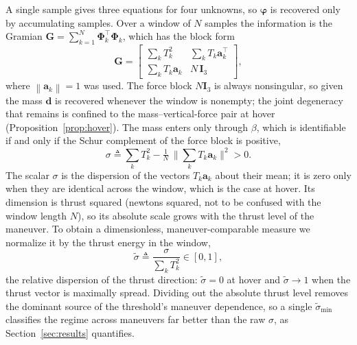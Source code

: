 \documentclass[lettersize,journal]{IEEEtran}
\newcommand{\norm}[1]{\left\| #1 \right\|}
\newcommand{\vect}[1]{\bm{#1}}
\newcommand{\mat}[1]{\mathbf{#1}}
\begin{document}
A single sample gives three equations for four unknowns, so $\vect{\varphi}$ is
recovered only by accumulating samples. Over a window of $N$ samples the
information is the Gramian $\mat{G}=\sum_{k=1}^{N}\mat{\Phi}_k^{\!\top}\mat{\Phi}_k$,
which has the block form
\begin{equation}
\mat{G}=
\begin{bmatrix}
\sum_k T_k^2 & \sum_k T_k\vect{a}_k^{\!\top}\\[2pt]
\sum_k T_k\vect{a}_k & N\,\mat{I}_3
\end{bmatrix},
\label{eq:gramian}
\end{equation}
where $\norm{\vect{a}_k}=1$ was used. The force block $N\mat{I}_3$ is always
nonsingular, so given the mass $\vect{d}$ is recovered whenever the
window is nonempty; the joint degeneracy that remains is confined to the
mass--vertical-force pair at hover (Proposition~\ref{prop:hover}). The
mass enters only through $\beta$, which is identifiable if and only if the Schur
complement of the force block is positive,
\begin{equation}
\sigma \triangleq \sum_k T_k^2 - \tfrac{1}{N}\,\Big\|\textstyle\sum_k T_k\vect{a}_k\Big\|^2 > 0 .
\label{eq:schur}
\end{equation}
The scalar $\sigma$ is the dispersion of the vectors $T_k\vect{a}_k$ about their
mean; it is zero only when they are identical across the window, which is the
case at hover. Its dimension is thrust squared (newtons squared, not to be
confused with the window length $N$), so its
absolute scale grows with the thrust level of the maneuver. To obtain a
dimensionless, maneuver-comparable measure we normalize it by the thrust energy
in the window,
\begin{equation}
\tilde\sigma \triangleq \frac{\sigma}{\sum_k T_k^2}\in[0,1],
\label{eq:snorm}
\end{equation}
the relative dispersion of the thrust direction: $\tilde\sigma=0$ at hover and
$\tilde\sigma\!\to\!1$ when the thrust vector is maximally spread. Dividing out
the absolute thrust level removes the dominant source of the threshold's
maneuver dependence, so a single $\tilde\sigma_{\min}$ classifies the regime
across maneuvers far better than the raw $\sigma$, as Section~\ref{sec:results}
quantifies.
\end{document}
